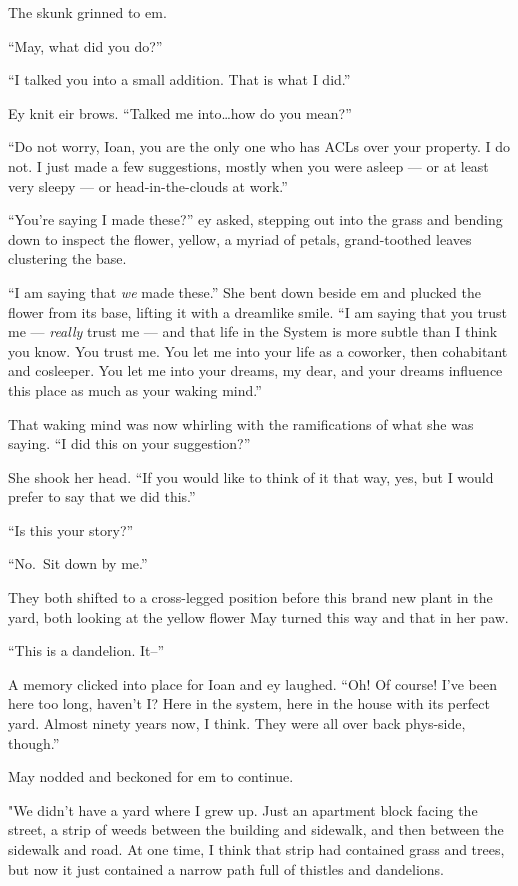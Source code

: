 The skunk grinned to em.

``May, what did you do?''

``I talked you into a small addition. That is what I did.''

Ey knit eir brows. ``Talked me into\ldots how do you mean?''

``Do not worry, Ioan, you are the only one who has ACLs over your property. I do not. I just made a few suggestions, mostly when you were asleep — or at least very sleepy — or head-in-the-clouds at work.''

``You're saying I made these?'' ey asked, stepping out into the grass and bending down to inspect the flower, yellow, a myriad of petals, grand-toothed leaves clustering the base.

``I am saying that \emph{we} made these.'' She bent down beside em and plucked the flower from its base, lifting it with a dreamlike smile. ``I am saying that you trust me — \emph{really} trust me — and that life in the System is more subtle than I think you know. You trust me. You let me into your life as a coworker, then cohabitant and cosleeper. You let me into your dreams, my dear, and your dreams influence this place as much as your waking mind.''

That waking mind was now whirling with the ramifications of what she was saying. ``I did this on your suggestion?''

She shook her head. ``If you would like to think of it that way, yes, but I would prefer to say that we did this.''

``Is this your story?''

``No.~Sit down by me.''

They both shifted to a cross-legged position before this brand new plant in the yard, both looking at the yellow flower May turned this way and that in her paw.

``This is a dandelion. It--''

A memory clicked into place for Ioan and ey laughed. ``Oh! Of course! I've been here too long, haven't I? Here in the system, here in the house with its perfect yard. Almost ninety years now, I think. They were all over back phys-side, though.''

May nodded and beckoned for em to continue.

"We didn't have a yard where I grew up. Just an apartment block facing the street, a strip of weeds between the building and sidewalk, and then between the sidewalk and road. At one time, I think that strip had contained grass and trees, but now it just contained a narrow path full of thistles and dandelions.

